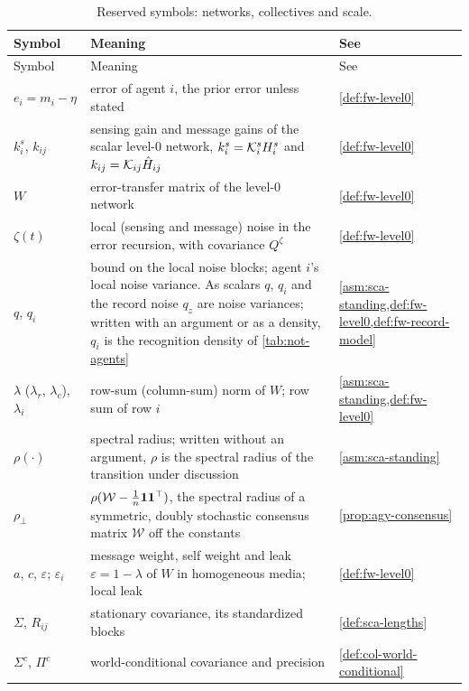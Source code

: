 \endgroup

\begingroup
\small
\setlength{\tabcolsep}{4pt}
\begin{longtable}{@{}>{\raggedright\arraybackslash}p{}>{\raggedright\arraybackslash}p{}>{\raggedright\arraybackslash}p{}@{}}
\caption{Reserved symbols: networks, collectives and scale.}\label{tab:not-networks}\\
\toprule
Symbol & Meaning & See\\
\midrule
\endfirsthead
\toprule
Symbol & Meaning & See\\
\midrule
\endhead
\bottomrule
\endfoot
$e_i=m_i-\eta$ & error of agent $i$, the prior error unless stated & \cref{def:fw-level0}\\
$k^s_i$, $k_{ij}$ & sensing gain and message gains of the scalar level-0 network, $k^s_i=\mathcal{K}^s_iH^s_i$ and $k_{ij}=\mathcal{K}_{ij}\hat H_{ij}$ & \cref{def:fw-level0}\\
$W$ & error-transfer matrix of the level-0 network & \cref{def:fw-level0}\\
$\zeta(t)$ & local (sensing and message) noise in the error recursion, with covariance $Q^\zeta$ & \cref{def:fw-level0}\\
$q$, $q_i$ & bound on the local noise blocks; agent $i$'s local noise variance. As scalars $q$, $q_i$ and the record noise $q_z$ are noise variances; written with an argument or as a density, $q_i$ is the recognition density of \cref{tab:not-agents} & \cref{asm:sca-standing,def:fw-level0,def:fw-record-model}\\
$\lambda$ ($\lambda_r$, $\lambda_c$), $\lambda_i$ & row-sum (column-sum) norm of $W$; row sum of row $i$ & \cref{asm:sca-standing,def:fw-level0}\\
$\rho(\cdot)$ & spectral radius; written without an argument, $\rho$ is the spectral radius of the transition under discussion & \cref{asm:sca-standing}\\
$\rho_\perp$ & $\rho(\mathcal W-\frac1n\mathbf{1}\mathbf{1}^\top)$, the spectral radius of a symmetric, doubly stochastic consensus matrix $\mathcal W$ off the constants & \cref{prop:agy-consensus}\\
$a$, $c$, $\varepsilon$; $\varepsilon_i$ & message weight, self weight and leak $\varepsilon=1-\lambda$ of $W$ in homogeneous media; local leak & \cref{def:fw-level0}\\
$\Sigma$, $R_{ij}$ & stationary covariance, its standardized blocks & \cref{def:sca-lengths}\\
$\Sigma^c$, $\Pi^c$ & world-conditional covariance and precision & \cref{def:col-world-conditional}\\

\end{longtable}
